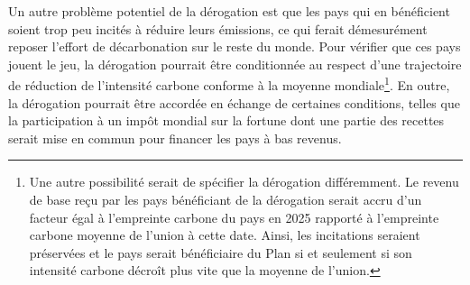 \documentclass[a5paper,french,openany]{memoir}
\begin{document}
Un autre problème potentiel de la dérogation est que les pays qui en bénéficient soient trop peu incités à réduire leurs émissions, ce qui ferait démesurément reposer l'effort de décarbonation sur le reste du monde. Pour vérifier que ces pays jouent le jeu, la dérogation pourrait être conditionnée au respect d'une trajectoire de réduction de l'intensité carbone conforme à la moyenne mondiale\footnote{Une autre possibilité serait de spécifier la dérogation différemment. Le revenu de base reçu par les pays bénéficiant de la dérogation serait accru d'un facteur égal à l'empreinte carbone du pays en 2025 rapporté à l'empreinte carbone moyenne de l'union à cette date. Ainsi, les incitations seraient préservées et le pays serait bénéficiaire du Plan si et seulement si son intensité carbone décroît plus vite que la moyenne de l'union.}. 
En outre, la dérogation pourrait être accordée en échange de certaines conditions, telles que la participation à un impôt mondial sur la fortune dont une partie des recettes serait mise en commun pour financer les pays à bas revenus.
\end{document}

